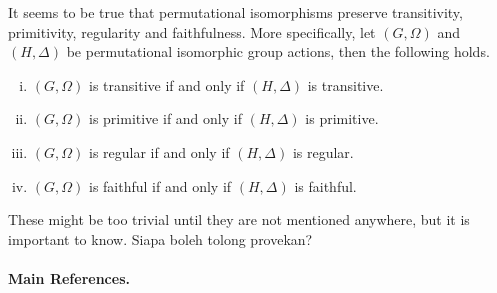 \begin{remark}
It seems to be true that permutational isomorphisms preserve transitivity, primitivity, regularity and faithfulness. More specifically, let $(G,\Omega)$ and $(H,\Delta)$ be permutational isomorphic group actions, then  the following holds.
\begin{enumerate}[(i)]
	\item $(G,\Omega)$ is transitive if and only if $(H,\Delta)$ is transitive.
	\item $(G,\Omega)$ is primitive if and only if $(H,\Delta)$ is primitive.
	\item $(G,\Omega)$ is regular if and only if $(H,\Delta)$ is regular.
	\item $(G,\Omega)$ is faithful if and only if $(H,\Delta)$ is faithful.
\end{enumerate}
These might be too trivial until they are not mentioned anywhere, but it is important to know. Siapa boleh tolong provekan?
\end{remark}

\paragraph{Main References.} \cite{Praeger2018,Dixon1996,Cameron1999}